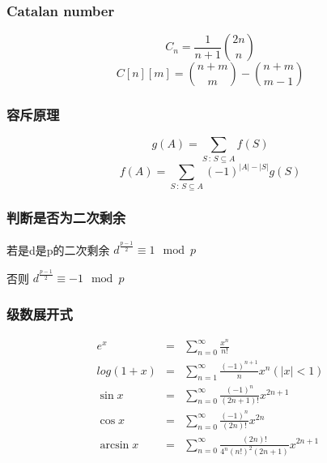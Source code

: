 \subsubsection{Catalan number}
\[ C_n = \frac{1}{n+1}{2n \choose n} \]
\[ C[n][m] = {n+m \choose m} - {n+m \choose m-1} \]
\subsubsection{容斥原理}
\[ g(A)=\sum_{S\,:\,S\subseteq A}f(S) \]
\[ f(A)=\sum_{S\,:\,S\subseteq A}(-1)^{\left|A\right|-\left|S\right|}g(S) \]
\subsubsection{判断是否为二次剩余}
若是d是p的二次剩余 $ d^{\frac{p-1}{2}} \equiv 1 \mod p $

否则 $ d^{\frac{p-1}{2}} \equiv -1 \mod p $
\subsubsection{级数展开式}
\begin{eqnarray*}
	e^x &=& \sum\limits_{n=0}^{\infty} \frac{x^n}{n!} \\
	log(1+x) &=& \sum\limits_{n=1}^{\infty} \frac{(-1)^{n+1}}{n}x^n (|x| < 1) \\
	\sin x &=& \sum\limits_{n=0}^{\infty} \frac{(-1)^n}{(2n+1)!}x^{2n+1} \\
	\cos x &=& \sum\limits_{n=0}^{\infty} \frac{(-1)^n}{(2n)!}x^{2n} \\
	\arcsin x &=& \sum\limits_{n=0}^{\infty} \frac{(2n)!}{4^n(n!)^2(2n+1)} x^{2n+1}
\end{eqnarray*} 
